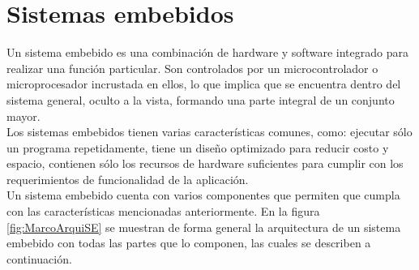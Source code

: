 \section{Sistemas embebidos}
	Un sistema embebido es una combinación de hardware y software integrado para realizar una función particular. Son controlados por un microcontrolador o microprocesador incrustada en ellos, lo que implica que se encuentra dentro del sistema general, oculto a la vista, formando una parte integral de un conjunto mayor. \cite{vahid1999} \\
	
	Los sistemas embebidos tienen varias características comunes, como: ejecutar sólo un programa repetidamente, tiene un diseño optimizado para reducir costo y espacio, contienen sólo los recursos de hardware suficientes para cumplir con  los  requerimientos  de  funcionalidad  de  la  aplicación. \cite{kamal2008} \\
	
	Un sistema embebido cuenta con varios componentes que permiten que cumpla con las características mencionadas anteriormente. En la figura \ref{fig:MarcoArquiSE} se muestran de forma general la arquitectura de un sistema embebido con todas las partes que lo componen, las cuales se describen a continuación. \cite{nadalEmbebidos} \cite{heath2005}
	

